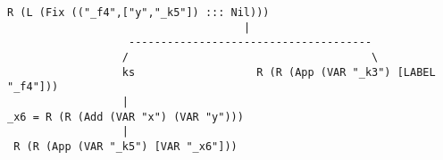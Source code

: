 \begin{landscape}
\begin{lstlisting}[basicstyle=\fontsize{6.5}{7.5}\selectfont\ttfamily]
                 R (L (Fix (("_f4",["y","_k5"]) ::: Nil)))                                                                                                                       
                                     |                                                                                                                                           
                   --------------------------------------                                                                                                                        
                  /                                      \                                                                                                                       
                  ks                   R (R (App (VAR "_k3") [LABEL "_f4"]))                                                                                                     
                  |                                                                                                                                                              
_x6 = R (R (Add (VAR "x") (VAR "y")))                                                                                                                                            
                  |                                                                                                                                                              
 R (R (App (VAR "_k5") [VAR "_x6"]))                                                                                                                                             

\end{lstlisting}
\end{landscape}
\clearpage

